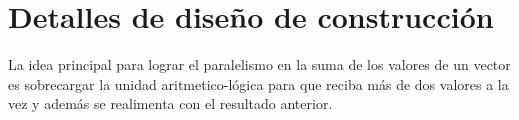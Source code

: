 \section{Detalles de diseño de construcción}

La idea principal para lograr el paralelismo en la suma de los valores de un vector es sobrecargar la unidad
aritmetico-lógica para que reciba más de dos valores a la vez y además se realimenta con el resultado anterior.
